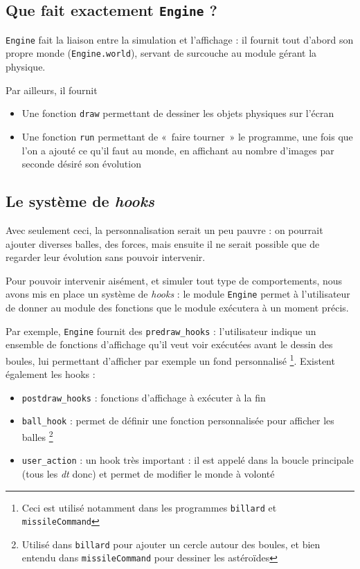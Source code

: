 \documentclass[a4paper]{scrartcl}
\begin{document}
\subsection{Que fait exactement \texttt{Engine} ?}
\texttt{Engine} fait la liaison entre la simulation et l'affichage :
il fournit tout d'abord son propre monde (\texttt{Engine.world}),
servant de surcouche au module gérant la physique.

Par ailleurs, il fournit 
\begin{itemize}
\item Une fonction \texttt{draw} permettant de dessiner les objets
  physiques sur l'écran
\item Une fonction \texttt{run} permettant de «~faire tourner~» le
  programme, une fois que l'on a ajouté ce qu'il faut au monde, en
  affichant au nombre d'images par seconde désiré son évolution
\end{itemize}

\subsection{Le système de \emph{hooks}}
Avec seulement ceci, la personnalisation serait un peu pauvre : on
pourrait ajouter diverses balles, des forces, mais ensuite il ne
serait possible que de regarder leur évolution sans pouvoir
intervenir.

Pour pouvoir intervenir aisément, et simuler tout type de
comportements, nous avons mis en place un système de \emph{hooks} : le
module \texttt{Engine} permet à l'utilisateur de donner au module des
fonctions que le module exécutera à un moment précis.

Par exemple, \texttt{Engine} fournit des \texttt{predraw\_hooks} :
l'utilisateur indique un ensemble de fonctions d'affichage qu'il veut
voir exécutées avant le dessin des boules, lui permettant d'afficher
par exemple un fond personnalisé \footnote{Ceci est utilisé notamment
  dans les programmes \texttt{billard} et \texttt{missileCommand}}.
Existent également les hooks :
\begin{itemize}
\item \texttt{postdraw\_hooks} : fonctions d'affichage à exécuter à la fin
\item \texttt{ball\_hook} : permet de définir une fonction
  personnalisée pour afficher les balles \footnote{Utilisé dans
    \texttt{billard} pour ajouter un cercle autour des boules, et bien
    entendu dans \texttt{missileCommand} pour dessiner les astéroïdes}
\item \texttt{user\_action} : un hook très important : il est appelé
  dans la boucle principale (tous les \emph{dt} donc) et permet de
  modifier le monde à volonté
\end{itemize}
\end{document}
